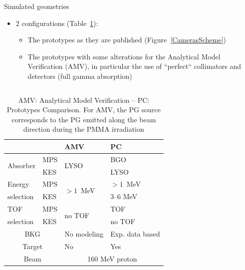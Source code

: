 \documentclass[final]{beamer} %
\begin{document}
\begin{frame}{}
\begin{columns}[t]
\begin{column}{0.49\textwidth}
	\end{column} %
	
	\begin{column}{0.49\textwidth} %
	  \vspace{-2ex}
		\begin{block}{Simulated geometries}
		
					\begin{itemize}
						\item 2 configurations (Table~\ref{CamerasParameters}):
						\begin{itemize}
							\item The prototypes as they are published (Figure~\ref{CamerasScheme})
							\item The prototypes with some alterations for the Analytical Model Verification (AMV), in particular the use of ``perfect`` collimators and detectors (full gamma absorption) 
						\end{itemize}

					\end{itemize}		
			\begin{columns}[t]

				
				\begin{column}{0.49\textwidth}			
			
					\begin{table}[h]
						\centering
						\small
						\begin{tabular}{|l|l|l|l|}
							\hline
							\multicolumn{2}{|c|}{}& 	AMV  & PC\\
							\hline
							\multirow{2}{*}{Absorber}	& MPS & \multirow{2}{*}{LYSO} 							& BGO \\
							\cline{2-2}\cline{4-4}
															& KES & 																& LYSO \\
							\hline
							Energy & MPS & \multirow{2}{*}{$>1$~MeV}			&	$>1$~MeV						\\
							\cline{2-2}\cline{4-4}
							selection				& KES & & 3--6 MeV \\
							\hline	
							TOF & MPS & \multirow{2}{*}{no TOF}			&		TOF						\\
							\cline{2-2}\cline{4-4}
							selection				& KES & & no TOF \\
							\hline		
							\multicolumn{2}{|c|}{BKG} & No modeling & Exp. data based   \\
							\hline
							\multicolumn{2}{|c|}{Target} & No & Yes   \\			
							\hline
							\multicolumn{2}{|c|}{Beam} & \multicolumn{2}{|c|}{160 MeV proton}   \\								
							\hline		
						\end{tabular}
						\caption{AMV: Analytical Model Verification -- PC: Prototypes Comparison. For AMV, the PG source corresponds to the PG emitted along the beam direction during the PMMA irradiation }
						\label{CamerasParameters}
						\end{table}
				\end{column}			


\end{columns}
\end{block}
\end{column}
\end{columns}
\end{frame}
\end{document}
